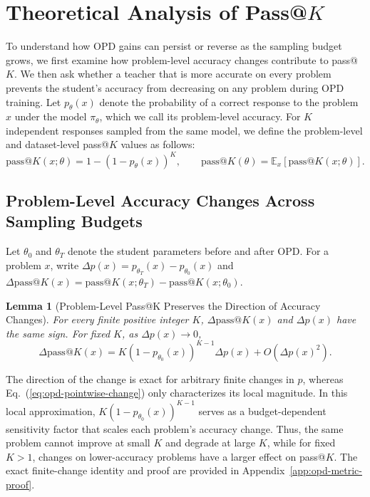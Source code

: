 \documentclass{article}
\theoremstyle{opdplain}
\newtheorem{lemma}{Lemma}
\begin{document}
\section{Theoretical Analysis of \texorpdfstring{Pass@$K$}{Pass@K}}
\label{sec:opd-theory}
To understand how OPD gains can persist or reverse as the sampling budget grows, we first examine how problem-level accuracy changes contribute to pass@$K$. We then ask whether a teacher that is more accurate on every problem prevents the student's accuracy from decreasing on any problem during OPD training. Let $p_\theta(x)$ denote the probability of a correct response to the problem $x$ under the model $\pi_\theta$, which we call its problem-level accuracy. For $K$ independent responses sampled from the same model, we define the problem-level and dataset-level pass@$K$ values as follows:
\[
 \mathrm{pass}@K(x;\theta)=1-(1-p_\theta(x))^K,\qquad
 \mathrm{pass}@K(\theta)=\mathbb E_x[\mathrm{pass}@K(x;\theta)].
\]
\subsection{Problem-Level Accuracy Changes Across Sampling Budgets}
\label{sec:opd-pointwise}

Let $\theta_0$ and $\theta_T$ denote the student parameters before and after OPD. For a problem $x$, write $\Delta p(x)=p_{\theta_T}(x)-p_{\theta_0}(x)$ and $\Delta\mathrm{pass}@K(x)=\mathrm{pass}@K(x;\theta_T)-\mathrm{pass}@K(x;\theta_0)$.

\begin{lemma}[Problem-Level Pass@K Preserves the Direction of Accuracy Changes]
\label{lem:opd-pointwise}
For every finite positive integer $K$, $\Delta\mathrm{pass}@K(x)$ and $\Delta p(x)$ have the same sign. For fixed $K$, as $\Delta p(x)\to0$,
\begin{equation}
\label{eq:opd-pointwise-change}
 \Delta\mathrm{pass}@K(x)
 =K(1-p_{\theta_0}(x))^{K-1}\Delta p(x)+O(\Delta p(x)^2).
\end{equation}
\end{lemma}


The direction of the change is exact for arbitrary finite changes in $p$, whereas Eq.~(\ref{eq:opd-pointwise-change}) only characterizes its local magnitude. In this local approximation, $K(1-p_{\theta_0}(x))^{K-1}$ serves as a budget-dependent sensitivity factor that scales each problem's accuracy change. Thus, the same problem cannot improve at small $K$ and degrade at large $K$, while for fixed $K>1$, changes on lower-accuracy problems have a larger effect on pass@$K$. The exact finite-change identity and proof are provided in Appendix~\ref{app:opd-metric-proof}.
\end{document}
